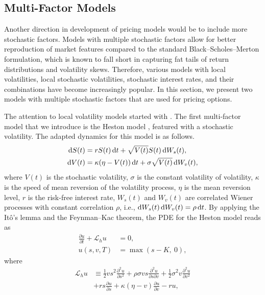 \documentclass{UUThesisTemplate}
\begin{document}
\subsection{Multi-Factor Models}
\label{sub:multifactor}
\par Another direction in development of pricing models would be to include more stochastic factors. Models with multiple stochastic factors allow for better reproduction of market features compared to the standard Black--Scholes--Merton formulation, which is known to fall short in capturing fat tails of return distributions and volatility skews. Therefore, various models with local volatilities, local stochastic volatilities, stochastic interest rates, and their combinations have become increasingly popular. In this section, we present two models with multiple stochastic factors that are used for pricing options.
\par The attention to local volatility models started with \cite{dupire1994pricing}. The first multi-factor model that we introduce is the Heston model \cite{heston1993closed}, featured with a stochastic volatility. The adapted dynamics for this model is as follows.
\begin{align}
\dif S(t) & =  rS(t)\dif t + \sqrt{V(t)} S(t) \dif W_s(t), \label{qlsvSDE1} \\
\dif V(t) & =  \kappa(\eta-V(t))\dif t + \sigma \sqrt{V(t)}\dif W_v(t), \label{qlsvSDE2}
\end{align}
where $V(t)$ is the stochastic volatility, $\sigma$ is the constant volatility of volatility, $\kappa$ is the speed of mean reversion of the volatility process, $\eta$ is the mean reversion level, $r$ is the risk-free interest rate, $W_s(t)$ and $W_v(t)$ are correlated Wiener processes with constant correlation $\rho$, i.e., $\dif W_s(t) \dif W_v(t) = \rho \dif t$. By applying the It\^{o}'s lemma and the Feynman--Kac theorem, the PDE for the Heston model reads as
\begin{align}
\frac{\partial u}{\partial t}+\mathcal{L}_h u&=0, \nonumber \\
u(s,v,T) &= \max(s-K,\ 0), \label{hstPDE}
\end{align}
where
\begin{align}
\mathcal{L}_{h} u &\equiv \frac{1}{2}vs^2\frac{\partial^2 u}{\partial s^2} + \rho\sigma v s \frac{\partial^2 u}{\partial s\partial v} + \frac{1}{2}\sigma^2v\frac{\partial^2 u}{\partial v^2} \nonumber \\ 
               &+ rs\frac{\partial u}{\partial s} + \kappa(\eta-v)\frac{\partial u}{\partial v} - ru, \label{eqHSTop}
\end{align}
\end{document}
